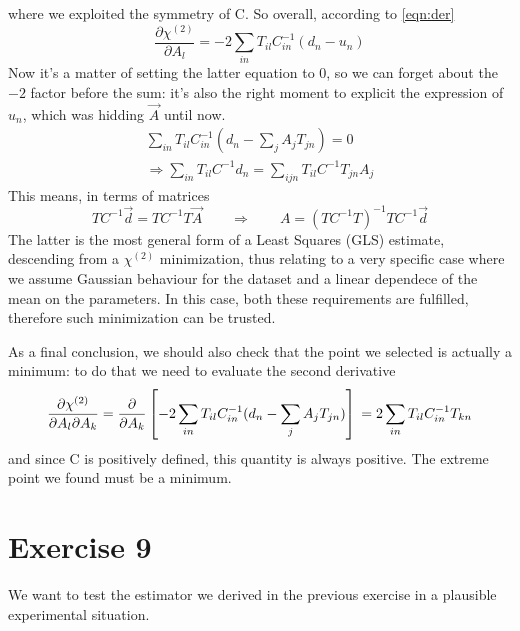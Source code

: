 \documentclass[a4paper,11pt,fleqn]{article}
\begin{document}
where we exploited the symmetry of C. So overall, according to \ref{eqn:der}
\begin{equation*}
    \frac{\partial \chi^{(2)}}{\partial A_l} = -2 \sum_{in}T_{il}C^{-1}_{in}(d_n-u_n)
\end{equation*}
Now it's a matter of setting the latter equation to 0, so we can forget about 
the $-2$ factor before the sum: it's also the right 
moment to explicit the expression of $u_n$, which was hidding $\vec{A}$
until now.
\begin{gather*}
    \sum_{in}T_{il}C^{-1}_{in}(d_n-\sum_j A_j T_{jn}) = 0 \\
    \Rightarrow \sum_{in}T_{il}C^{-1}d_n = \sum_{ijn}T_{il}C^{-1}T_{jn}A_j
\end{gather*}
This means, in terms of matrices
\begin{equation}
    TC^{-1}\vec{d}=TC^{-1}T\vec{A} \qquad \Rightarrow \qquad A = (TC^{-1}T)^{-1}TC^{-1}\vec{d}
\end{equation}
The latter is the most general form of a Least Squares (GLS) estimate, 
descending from a $\chi^{(2)}$ minimization, thus relating to a very specific 
case where we assume Gaussian behaviour for the dataset and a linear dependece 
of the mean on the parameters. In this case, both these requirements are 
fulfilled, therefore such minimization can be trusted.

\medskip

As a final conclusion, we should also check that the point we selected is actually a minimum: to 
do that we need to evaluate the second derivative 
\begin{equation*}
    \frac{\partial \chi^{(2)}}{\partial A_l \partial A_k} = \frac{\partial}{\partial A_k}\left[-2 \sum_{in}T_{il}C^{-1}_{in}(d_n-\sum_j A_j T_{jn})\right]\\ 
    = 2\sum_{in}T_{il}C^{-1}_{in}T_{kn}
\end{equation*}
and since C is positively defined, this quantity is always positive. The 
extreme point we found must be a minimum.

\section{Exercise 9}
We want to test the estimator we derived in the previous exercise in a
plausible experimental situation. 
\end{document}
